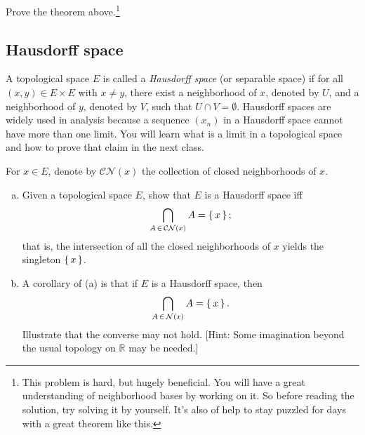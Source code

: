 \begin{qst}
  Prove the theorem above.\footnote{This problem is hard, but hugely beneficial. You will have a great understanding of neighborhood bases by working on it.
  So before reading the solution, try solving it by yourself. It's also of help to stay puzzled for days with a great theorem like this.}
\end{qst}


\subsection{Hausdorff space}
A topological space $E$ is called a {\em Hausdorff space} (or separable space) if for all $(x,y) \in E \times E$ with $x \neq y$, there exist a neighborhood of $x$, denoted by $U$, and a neighborhood of $y$, denoted by $V$, such that $U \cap V = \emptyset$.
Hausdorff spaces are widely used in analysis because a sequence $(x_n)$ in a Hausdorff space cannot have more than one limit. 
You will learn what is a limit in a topological space and how to prove that claim in the next class.    

\begin{qst}
  For $x \in E$, denote by  $\mathcal{CN}(x)$ the collection of closed neighborhoods of $x$.
  \begin{enumerate}[(a)]
    \item  
    Given a topological space $E$, show that $E$ is a Hausdorff space iff 
    $$
    \bigcap_{A \,\in\, \mathcal{CN}(x)} A = \set{x};
    $$
    that is, the intersection of all the closed neighborhoods of $x$ yields the singleton $\set{x}$. 
    \item A corollary of (a) is that if $E$ is a Hausdorff space, then
    $$
    \bigcap_{A \,\in\, \mathcal{N}(x)} A = \set{x}.
    $$ 
    Illustrate that the converse may not hold. [Hint: Some imagination beyond the usual topology on $\mathbb R$ may be needed.]
  \end{enumerate}

\end{qst}

